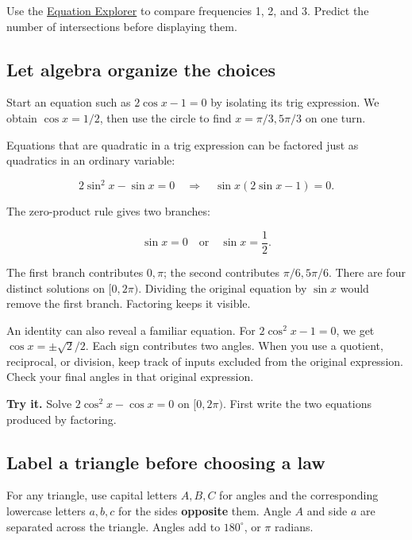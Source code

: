 Use the \href{https://bobovski66.github.io/PrecalculusII/demos/trig_equations.html}{Equation Explorer} to compare frequencies 1, 2, and 3. Predict the number of intersections before displaying them.

\hypertarget{m5-let-algebra-organize-the-choices}{%
\subsection{Let algebra organize the choices}\label{m5-let-algebra-organize-the-choices}}

Start an equation such as \(2\cos x-1=0\) by isolating its trig expression. We obtain \(\cos x=1/2\), then use the circle to find \(x=\pi/3,5\pi/3\) on one turn.

Equations that are quadratic in a trig expression can be factored just as quadratics in an ordinary variable:

\[
2\sin^2x-\sin x=0
\quad\Longrightarrow\quad
\sin x(2\sin x-1)=0.
\]

The zero-product rule gives two branches:

\[
\sin x=0
\quad\text{or}\quad
\sin x=\frac12.
\]

The first branch contributes \(0,\pi\); the second contributes \(\pi/6,5\pi/6\). There are four distinct solutions on \([0,2\pi)\). Dividing the original equation by \(\sin x\) would remove the first branch. Factoring keeps it visible.

An identity can also reveal a familiar equation. For \(2\cos^2x-1=0\), we get \(\cos x=\pm\sqrt2/2\). Each sign contributes two angles. When you use a quotient, reciprocal, or division, keep track of inputs excluded from the original expression. Check your final angles in that original expression.

\textbf{Try it.} Solve \(2\cos^2x-\cos x=0\) on \([0,2\pi)\). First write the two equations produced by factoring.

\hypertarget{m5-label-a-triangle-before-choosing-a-law}{%
\subsection{Label a triangle before choosing a law}\label{m5-label-a-triangle-before-choosing-a-law}}

For any triangle, use capital letters \(A,B,C\) for angles and the corresponding lowercase letters \(a,b,c\) for the sides \textbf{opposite} them. Angle \(A\) and side \(a\) are separated across the triangle. Angles add to \(180^\circ\), or \(\pi\) radians.

